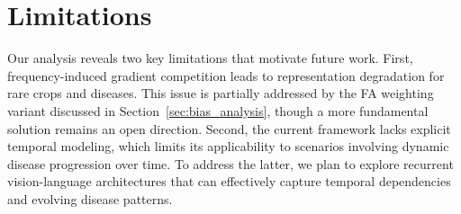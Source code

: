 \documentclass[sigconf,anonymous,review]{acmart}
\begin{document}
\section*{Limitations}
Our analysis reveals two key limitations that motivate future work. First, frequency-induced gradient competition leads to representation degradation for rare crops and diseases. This issue is partially addressed by the FA weighting variant discussed in Section~\ref{sec:bias_analysis}, though a more fundamental solution remains an open direction. Second, the current framework lacks explicit temporal modeling, which limits its applicability to scenarios involving dynamic disease progression over time. To address the latter, we plan to explore recurrent vision-language architectures that can effectively capture temporal dependencies and evolving disease patterns.















\end{document}
